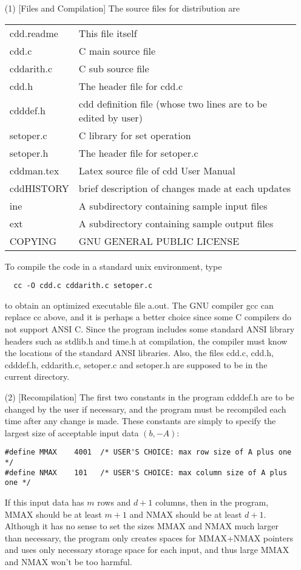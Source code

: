 \begin{itemize}
\item[(1)] [Files and Compilation] The source files for distribution are

\begin{tabular}{ll}
     cdd.readme  &   This file itself\\
     cdd.c       &   C main source file\\
     cddarith.c  &   C sub source file\\  
     cdd.h       &   The header file for cdd.c\\
     cdddef.h    &   cdd definition file (whose two lines are to be edited by user)\\
     setoper.c   &   C library for set operation\\
     setoper.h   &   The header file for setoper.c \\
     cddman.tex  &  Latex source file of cdd User Manual\\
     cddHISTORY  &   brief description of changes made at each updates\\
     ine         &   A subdirectory containing sample input files\\
     ext         &   A subdirectory containing sample output files\\
     COPYING     &   GNU GENERAL PUBLIC LICENSE
\end{tabular}

\noindent
To compile the code in a standard unix environment, type
\begin{verbatim}
  cc -O cdd.c cddarith.c setoper.c
\end{verbatim}

to obtain an optimized executable file a.out. The GNU compiler
gcc can replace cc above, and it is perhaps a better choice since
some C  compilers do not support ANSI C.
Since the program includes some standard ANSI library 
headers such as stdlib.h and time.h at compilation, 
the compiler must know the locations of the standard ANSI libraries.
Also, the files cdd.c, cdd.h, cdddef.h, cddarith.c, setoper.c and setoper.h are supposed to be
in the current directory.

\item[(2)] [Recompilation] The first two constants in the program cdddef.h are to be 
changed by the user if necessary, and the program must be recompiled
each time after any change is made.   These constants are simply
to specify the largest size of acceptable input data $(b, -A)$: 
\begin{verbatim}
#define MMAX    4001  /* USER'S CHOICE: max row size of A plus one */
#define NMAX    101   /* USER'S CHOICE: max column size of A plus one */
\end{verbatim}
If this input data has $m$ rows and $d+1$ columns, then in the program,
MMAX should be at least $m+1$ and NMAX should be at least
$d+1$.  Although it has no sense to set the sizes MMAX and NMAX much larger
than necessary, the program only creates spaces for MMAX+NMAX pointers
and uses only necessary storage space for each input, and
thus large MMAX and NMAX won't be too harmful.


\end{itemize}
